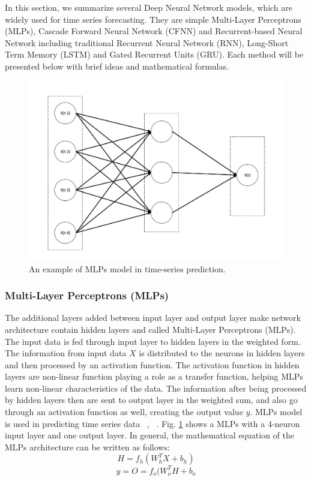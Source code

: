 \documentclass[a4paper,13pt,2p]{report}
\begin{document}
	 In this section, we summarize several Deep Neural Network models, which are widely used for time series forecasting. They are simple Multi-Layer Perceptrons (MLPs), Cascade Forward Neural Network (CFNN) and Recurrent-based Neural Network including traditional Recurrent Neural Network (RNN), Long-Short Term Memory (LSTM) and Gated Recurrent Units (GRU). Each method will be presented below with brief ideas and mathematical formulas. 

\begin{figure}[!ht] 
   \centering
   \includegraphics[width=0.75\linewidth]{pdf/model/model_ffnn}
  \caption{An example of MLPs model in time-series prediction.} 
  \label{fig_model_mlp} 
\end{figure}

\subsubsection{Multi-Layer Perceptrons (MLPs)}
\label{model_mlp}
	
	The additional layers added between input layer and output layer make network architecture contain hidden layers and called Multi-Layer Perceptrons (MLPs). The input data is fed through input layer to hidden layers in the weighted form. The information from input data $X$ is distributed to the neurons in hidden layers and then processed by an activation function. The activation function in hidden layers are non-linear function playing a role as a transfer function, helping MLPs learn non-linear characteristics of the data. The information after being processed by hidden layers then are sent to output layer in the weighted sum, and also go through an activation function as well, creating the output value $y$. MLPs model is used in predicting time series data ~\cite{azoff1994neural}, ~\cite{koskela1996time}.  Fig. \ref{fig_model_mlp} shows a MLPs with a 4-neuron input layer and one output layer. In general,  the mathematical equation of the MLPs architecture can be written as follows:
\begin{equation} \label{eq_mlp_1}
H = f_h(W_h^TX + b_h)
\end{equation}
\begin{equation} \label{eq_mlp_2}
y = O = f_o(W_o^TH + b_o
\end{equation}
\end{document}
